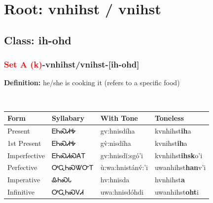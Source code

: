 \needspace{4in}
\section*{Root: vnhihst / vnihst}
\nopagebreak
{}
\needspace{3in}
\subsection*{Class: ih-ohd}
\nopagebreak
\needspace{2in}
\subsubsection*{\textcolor{Red}{Set A (k)}{-}\textbf{vnhihst/vnihst}{-}[ih-ohd]}
\nopagebreak
\textbf{Definition: } he/she is cooking it (refers to a specific food)
\\[0.5em]
\begin{tabularx}{\textwidth}{l X X X}%
\toprule%
\textbf{Form}&\textbf{Syllabary}&\textbf{With Tone}&\textbf{Toneless}\\%
\midrule%
Present&ᎬᏂᏍᏗᎭ&gv:hnisdíha&kvnhihst\textbf{ih}a\\%
1st Present&ᎬᏂᏍᏗᎭ&gv̀:nisdíha&kvnihst\textbf{ih}a\\%
Imperfective&ᎬᏂᏍᏗᏍᎪᎢ&gv:hnisdǐ:sgó’i&kvnhihst\textbf{ihsk}o'i\\%
Perfective&ᎤᏩᏂᏍᏔᏅᎢ&ù:wa:hnistánv́:’i&uwanhihst\textbf{han}v'i\\%
Imperative&ᎲᏂᏍᏓ&hv:hnisda&hvnhihst\textbf{a}\\%
Infinitive&ᎤᏩᏂᏍᏙᏗ&uwa:hnisdóhdi&uwanhihst\textbf{oht}i\\%
\bottomrule%
\end{tabularx}
\\[1em]